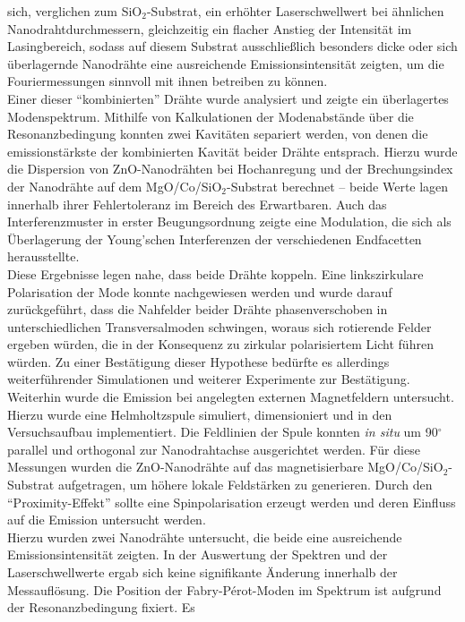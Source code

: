 sich, verglichen zum SiO$_\text{2}$-Substrat, ein erhöhter Laserschwellwert bei
ähnlichen Nanodrahtdurchmessern, gleichzeitig ein flacher Anstieg der Intensität
im Lasingbereich, sodass auf diesem Substrat ausschließlich besonders dicke oder
sich überlagernde Nanodrähte eine ausreichende Emissionsintensität zeigten, um
die Fouriermessungen sinnvoll mit ihnen betreiben zu können.\\ Einer dieser
``kombinierten'' Drähte wurde analysiert und zeigte ein überlagertes
Modenspektrum. Mithilfe von Kalkulationen der Modenabstände über die
Resonanzbedingung konnten zwei Kavitäten separiert werden, von denen die
emissionstärkste der kombinierten Kavität beider Drähte entsprach. Hierzu wurde
die Dispersion von ZnO-Nanodrähten bei Hochanregung und der Brechungsindex der
Nanodrähte auf dem MgO/Co/SiO$_\text{2}$-Substrat berechnet – beide Werte lagen
innerhalb ihrer Fehlertoleranz im Bereich des Erwartbaren. Auch das
Interferenzmuster in erster Beugungsordnung zeigte eine Modulation, die sich als
Überlagerung der Young'schen Interferenzen der verschiedenen Endfacetten
herausstellte.\\ Diese Ergebnisse legen nahe, dass beide Drähte koppeln. Eine
linkszirkulare Polarisation der Mode konnte nachgewiesen werden und wurde darauf
zurückgeführt, dass die Nahfelder beider Drähte phasenverschoben in
unterschiedlichen Transversalmoden schwingen, woraus sich rotierende Felder
ergeben würden, die in der Konsequenz zu zirkular polarisiertem Licht führen
würden. Zu einer Bestätigung dieser Hypothese bedürfte es allerdings
weiterführender Simulationen und weiterer Experimente zur Bestätigung.\\
Weiterhin wurde die Emission bei angelegten externen Magnetfeldern untersucht.
Hierzu wurde eine Helmholtzspule  simuliert, dimensioniert und in den
Versuchsaufbau implementiert. Die Feldlinien der Spule konnten \textit{in situ}
um 90$^\circ$ parallel und orthogonal zur Nanodrahtachse ausgerichtet werden.
Für diese Messungen wurden die ZnO-Nanodrähte auf das magnetisierbare
MgO/Co/SiO$_\text{2}$-Substrat aufgetragen, um höhere lokale Feldstärken zu
generieren. Durch den ``Proximity-Effekt'' sollte eine Spinpolarisation erzeugt
werden und deren Einfluss auf die Emission untersucht werden.\\ Hierzu wurden
zwei Nanodrähte untersucht, die beide eine ausreichende Emissionsintensität
zeigten. In der Auswertung der Spektren und der Laserschwellwerte ergab sich
keine signifikante Änderung innerhalb der Messauflösung. Die Position der
Fabry-Pérot-Moden im Spektrum ist aufgrund der Resonanzbedingung fixiert. Es
